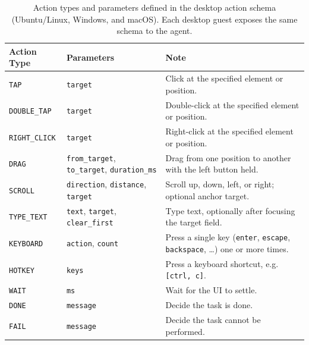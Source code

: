 \begin{table}[ht]
\centering
\caption{Action types and parameters defined in the desktop action schema (Ubuntu/Linux, Windows, and macOS). Each desktop guest exposes the same schema to the agent.}
\label{tab:osomni_desktop_actions}
\small
\setlength{\tabcolsep}{5pt}
\renewcommand{\arraystretch}{1.12}
\begin{tabular}{p{2.4cm}p{4.0cm}p{6.6cm}}
\toprule
Action Type & Parameters & Note \\
\midrule
\texttt{TAP}          & \texttt{target}                                              & Click at the specified element or position. \\
\texttt{DOUBLE\_TAP}  & \texttt{target}                                              & Double-click at the specified element or position. \\
\texttt{RIGHT\_CLICK} & \texttt{target}                                              & Right-click at the specified element or position. \\
\texttt{DRAG}         & \texttt{from\_target}, \texttt{to\_target}, \texttt{duration\_ms} & Drag from one position to another with the left button held. \\
\texttt{SCROLL}       & \texttt{direction}, \texttt{distance}, \texttt{target}       & Scroll up, down, left, or right; optional anchor target. \\
\texttt{TYPE\_TEXT}   & \texttt{text}, \texttt{target}, \texttt{clear\_first}        & Type text, optionally after focusing the target field. \\
\texttt{KEYBOARD}     & \texttt{action}, \texttt{count}                              & Press a single key (\texttt{enter}, \texttt{escape}, \texttt{backspace}, \dots) one or more times. \\
\texttt{HOTKEY}       & \texttt{keys}                                                & Press a keyboard shortcut, e.g. \texttt{[ctrl, c]}. \\
\texttt{WAIT}         & \texttt{ms}                                                  & Wait for the UI to settle. \\
\texttt{DONE}         & \texttt{message}                                             & Decide the task is done. \\
\texttt{FAIL}         & \texttt{message}                                             & Decide the task cannot be performed. \\
\bottomrule
\end{tabular}
\end{table}

